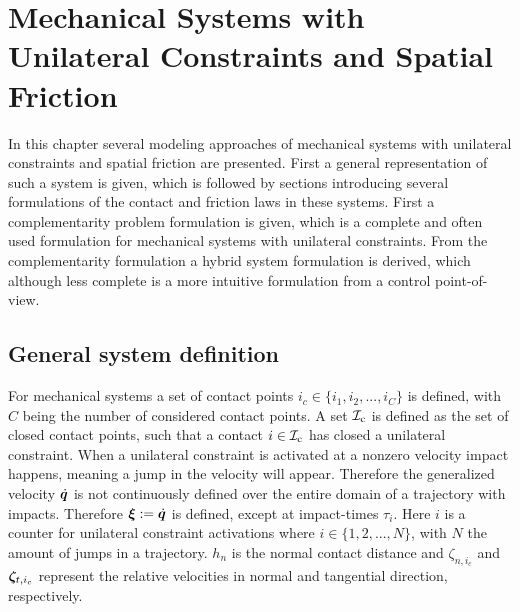 \documentclass[../DC2017114Bouma.tex]{subfiles}
\begin{document}
\graphicspath{{02_Material/img/}}
\renewcommand{\chaptermark}[1]{\markboth{\thechapter.\ #1}{}}
\renewcommand{\sectionmark}[1]{\markright{#1}{}}
\pagestyle{fancyreport}
\cleartooddpage
\pagestyle{fancyreport}
\chapter{Mechanical Systems with Unilateral Constraints and Spatial Friction}\label{ch:model}
In this chapter several modeling approaches of mechanical systems with unilateral constraints and spatial friction are presented. First a general representation of such a system is given, which is followed by sections introducing several formulations of the contact and friction laws in these systems. First a complementarity problem formulation is given, which is a complete and often used formulation for mechanical systems with unilateral constraints. From the complementarity formulation a hybrid system formulation is derived, which although less complete is a more intuitive formulation from a control point-of-view.
\section{General system definition}
For mechanical systems a set of contact points $i_c\in\{i_1,i_2,...,i_C\}$ is defined, with $C$ being the number of considered contact points. A set $\mathcal{I}_\text{c}$ is defined as the set of closed contact points, such that a contact $i\in\mathcal{I}_\text{c}$ has closed a unilateral constraint. When a unilateral constraint is activated at a nonzero velocity impact happens, meaning a jump in the velocity will appear. Therefore the generalized velocity $\dot{{\boldsymbol{q}}}$ is not continuously defined over the entire domain of a trajectory with impacts. Therefore $\boldsymbol{\xi}:=\dot{{\boldsymbol{q}}}$ is defined, except at impact-times $\tau_i$. Here $i$ is a counter for unilateral constraint activations where $i\in \{1,2,...,N\}$, with $N$ the amount of jumps in a trajectory. $h_n$ is the normal contact distance and $\zeta_{n,i_c}$ and $\boldsymbol{\zeta}_{t,i_c}$ represent the relative velocities in normal and tangential direction,  respectively. 
\end{document}
